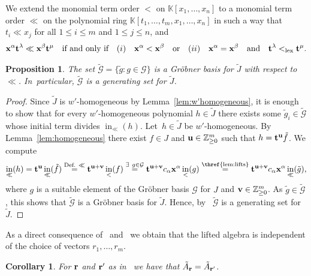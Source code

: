 \documentclass[pdftex]{sigma}%
\newtheorem{Corollary}[Theorem]{Corollary}
\newtheorem{Proposition}[Theorem]{Proposition}
\numberwithin{equation}{section}
\DeclareMathOperator{\init}{in}
\begin{document}
We extend the monomial term order $<$ on $\mathbb K[x_1,\dots,x_n]$ to a monomial term order $\ll$ on the polynomial ring $\mathbb K[t_1,\dots,t_m,x_1,\dots,x_n]$
in such a way that $t_i\ll x_j$ for all $1\le i\le m$ and $1\le j\le n$, and
\begin{gather}\label{eq:<<}
{\bf x}^\alpha{\bf t}^{\lambda}\ll{\bf x}^\beta{\bf t}^{\mu}\quad\text{if and only if}\quad
(i)\quad {\bf x}^\alpha<{\bf x}^\beta \quad \text{or}\quad
(ii)\quad {\bf x}^\alpha={\bf x}^\beta\quad \text{and}\quad {\bf t}^{\lambda}<_{\rm lex}{\bf t}^{\mu}.
\end{gather}

\begin{Proposition}
The set $\tilde{\mathcal{G}} =\{\tilde g\colon g\in \mathcal G\}$ is a Gr\"obner basis for $ \tilde{J}$ with respect to $\ll$. In~par\-ticular, $\tilde{\mathcal{G}} $ is a generating set for $\tilde{J}$.
\end{Proposition}
\begin{proof}
Since $\tilde{J}$ is $w'$-homogeneous by Lemma~\ref{lem:w'homogeneous}, it is enough to show that for every $w'$-homogeneous polynomial $h\in \tilde{J}$ there exists some $\tilde g_i\in\tilde{\mathcal{G}} $ whose initial term divides
$\init_\ll(h)$.
Let~$h\in \tilde{J}$ be $w'$-homogeneous.
By Lemma~\ref{lem:homogeneous} there exist $f\in J$ and ${\bf u}\in \mathbb{Z}_{\geq 0}^m$ such that $h={\bf t}^{\bf u}\tilde{f}$. We compute
\begin{gather*}
\init_{\ll}(h) = {\bf t}^{\bf u}\init_{\ll}(\tilde f) \overset{\text{Def. }\ll}{=} {\bf t}^{{\bf u}+{\bf v}}\init_<(f)
\overset{\exists \ g\in \mathcal G}{=} {\bf t}^{{\bf u}+{\bf v}}c_\alpha{\bf x}^{\alpha}\init_{<}(g) \overset{\text{\thref{lem:lifts}}}{=} {\bf t}^{{\bf u}+{\bf v}}c_\alpha{\bf x}^{\alpha}\init_{\ll}(\tilde g),
\end{gather*}
where $g$ is a suitable element of the Gr\"obner basis $\mathcal G$ for $J$ and ${\bf v}\in \mathbb Z_{\ge 0}^m$.
As $\tilde g\in \tilde{\mathcal{G}}$, this shows that $\tilde{\mathcal{G}}$ is a Gr\"obner basis for $\tilde{J}$.
Hence, by~\cite[Theorem~2.1.8]{herzog2011monomial} $\tilde{\mathcal{G}}$ is a generating set for $\tilde{J}$.
\end{proof}





As a direct consequence of~ and~ we obtain that the lifted algebra is independent of the choice of vectors $r_1, \dots ,r_m$.
\begin{Corollary}
For ${\bf r}$ and ${\bf r}'$ as in~ we have that $\tilde{A}_{\bf r} = \tilde{A}_{\bf r '}$.
\end{Corollary}
\end{document}
